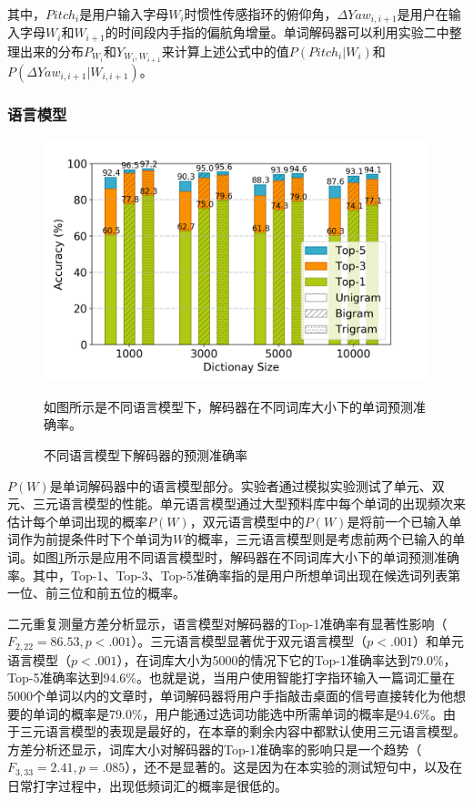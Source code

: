 其中，$Pitch_i$是用户输入字母$W_i$时惯性传感指环的俯仰角，$\Delta{Yaw}_{i,i+1}$是用户在输入字母$W_i$和$W_{i+1}$的时间段内手指的偏航角增量。单词解码器可以利用实验二中整理出来的分布$P_{W_i}$和$Y_{W_i,W_{i+1}}$来计算上述公式中的值$P(Pitch_i|W_i)$和$P(\Delta{Yaw}_{i,i+1}|W_{i,i+1})$。

\subsubsection{语言模型}

\begin{figure}[!htbp]
	\centering
	\includegraphics[width=0.8\linewidth]{figures/QwertyRing_language_model.png}
	\caption*{如图所示是不同语言模型下，解码器在不同词库大小下的单词预测准确率。}
	\caption{不同语言模型下解码器的预测准确率}
	\label{fig:QwertyRing_language_model}
\end{figure}

$P(W)$是单词解码器中的语言模型部分。实验者通过模拟实验测试了单元、双元、三元语言模型的性能\cite{ide2008american}。单元语言模型通过大型预料库中每个单词的出现频次来估计每个单词出现的概率$P(W)$，双元语言模型中的$P(W)$是将前一个已输入单词作为前提条件时下个单词为$W$的概率，三元语言模型则是考虑前两个已输入的单词。如图\ref{fig:QwertyRing_language_model}所示是应用不同语言模型时，解码器在不同词库大小下的单词预测准确率。其中，Top-1、Top-3、Top-5准确率指的是用户所想单词出现在候选词列表第一位、前三位和前五位的概率。

二元重复测量方差分析显示，语言模型对解码器的Top-1准确率有显著性影响（$F_{2,22}=86.53,p<.001$）。三元语言模型显著优于双元语言模型（$p<.001$）和单元语言模型（$p<.001$），在词库大小为5000的情况下它的Top-1准确率达到79.0\%，Top-5准确率达到94.6\%。也就是说，当用户使用智能打字指环输入一篇词汇量在5000个单词以内的文章时，单词解码器将用户手指敲击桌面的信号直接转化为他想要的单词的概率是79.0\%，用户能通过选词功能选中所需单词的概率是94.6\%。由于三元语言模型的表现是最好的，在本章的剩余内容中都默认使用三元语言模型。方差分析还显示，词库大小对解码器的Top-1准确率的影响只是一个趋势（$F_{3,33}=2.41,p=.085$），还不是显著的。这是因为在本实验的测试短句中，以及在日常打字过程中，出现低频词汇的概率是很低的。


